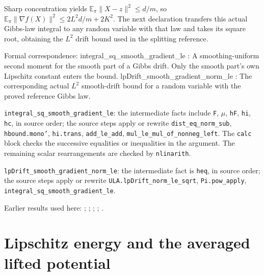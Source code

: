 \documentclass[11pt,a4paper]{report}
\begin{document}
\begin{leanbox}
Sharp concentration yields \(\mathbb E_\pi\|X-z\|^2\le d/m\), so \(\mathbb E_\pi\|\nabla f(X)\|^2\le2L^2d/m+2K^2\). The next declaration transfers this actual Gibbs-law integral to any random variable with that law and takes its square root, obtaining the \(L^2\) drift bound used in the splitting reference.



Formal correspondence: integral\_sq\_smooth\_gradient\_le : A smoothing-uniform second moment for the smooth part of a Gibbs drift. Only the smooth part's own Lipschitz constant enters the bound. lpDrift\_smooth\_gradient\_norm\_le : The corresponding actual \(L^2\) smooth-drift bound for a random variable with the proved reference Gibbs law.



\texttt{integral\_\allowbreak{}sq\_\allowbreak{}smooth\_\allowbreak{}gradient\_\allowbreak{}le}: the intermediate facts include \texttt{F}, \texttt{\ensuremath{\mu}}, \texttt{h\allowbreak{}F}, \texttt{hi}, \texttt{hc}, in source order; the source steps apply or rewrite \texttt{dist\_\allowbreak{}eq\_\allowbreak{}norm\_\allowbreak{}sub}, \texttt{hbound.\allowbreak{}mono'}, \texttt{hi.\allowbreak{}trans}, \texttt{add\_\allowbreak{}le\_\allowbreak{}add}, \texttt{mul\_\allowbreak{}le\_\allowbreak{}mul\_\allowbreak{}of\_\allowbreak{}nonneg\_\allowbreak{}left}. The \texttt{calc} block checks the successive equalities or inequalities in the argument. The remaining scalar rearrangements are checked by \texttt{nlinarith}.



\texttt{lp\allowbreak{}Drift\_\allowbreak{}smooth\_\allowbreak{}gradient\_\allowbreak{}norm\_\allowbreak{}le}: the intermediate fact is \texttt{heq}, in source order; the source steps apply or rewrite \texttt{ULA.\allowbreak{}lp\allowbreak{}Drift\_\allowbreak{}norm\_\allowbreak{}le\_\allowbreak{}sqrt}, \texttt{Pi.\allowbreak{}pow\_\allowbreak{}apply}, \texttt{integral\_\allowbreak{}sq\_\allowbreak{}smooth\_\allowbreak{}gradient\_\allowbreak{}le}.
\end{leanbox}


Earlier results used here: \cite[Section~3.13.10]{LangevinLean2026ULASC}; \cite[Section~3.13.2]{LangevinLean2026ULASC}; \cite[Section~3.26.13]{LangevinLean2026ULASC}; \cite[Section~3.26.3]{LangevinLean2026ULASC}; \cite[Section~3.49.6]{LangevinLean2026ULASC}.
\section{\texorpdfstring{Lipschitz energy and the averaged lifted potential}{Lipschitz energy and the averaged lifted potential}}
\label{proof-module-ProximalLangevin-SplittingCoupling-lean}
\end{document}
